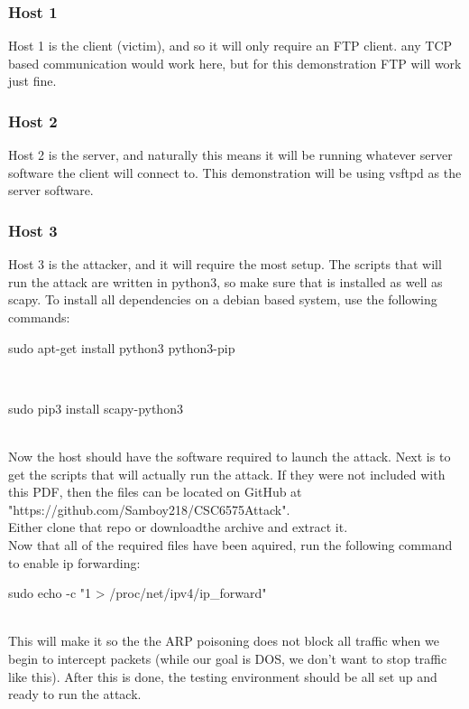 \documentclass{article}
\begin{document}
\subsubsection{Host 1}
Host 1 is the client (victim), and so it will only require an FTP client. any 
TCP based communication would work here, but for this demonstration FTP will
work just fine.
\subsubsection{Host 2}
Host 2 is the server, and naturally this means it will be running whatever
server software the client will connect to. This demonstration will be using
vsftpd as the server software.
\subsubsection{Host 3}
Host 3 is the attacker, and it will require the most setup. The scripts that
will run the attack are written in python3, so make sure that is installed
as well as scapy. To install all dependencies on a debian based system, use the
following commands:\\
\begin{verb}
sudo apt-get install python3 python3-pip
\end{verb}
\\
\begin{verb}
sudo pip3 install scapy-python3
\end{verb}
\\Now the host should have the software required to launch the attack. Next is to
get the scripts that will actually run the attack. If they were not included 
with this PDF, then the files can be located on GitHub at  \\
"https://github.com/Samboy218/CSC6575Attack". \\
Either clone that repo or downloadthe archive and extract it. \\
Now that all of the required files have been 
aquired, run the following command to enable ip forwarding:\\
\begin{verb}
sudo echo -c "1 > /proc/net/ipv4/ip_forward"
\end{verb}
\\This will make it so the the ARP poisoning does not block all traffic when we
begin to intercept packets (while our goal is DOS, we don't want to stop
traffic like this). After this is done, the testing environment should be all
set up and ready to run the attack.
\end{document}
